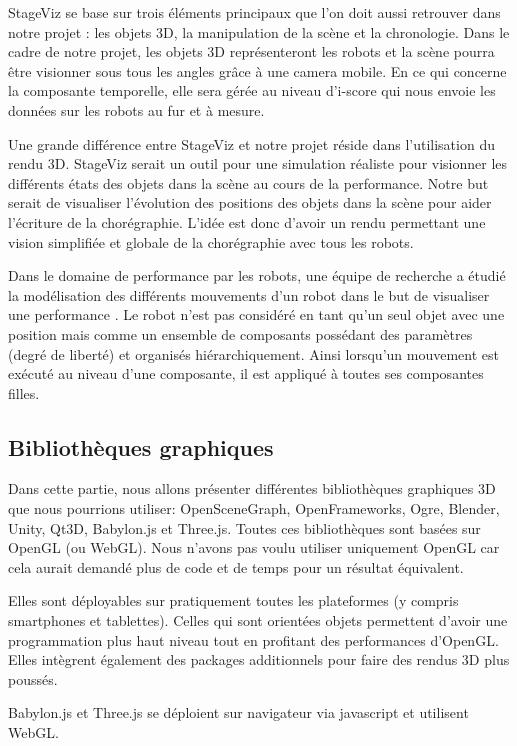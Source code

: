 StageViz se base sur trois éléments principaux que l'on doit aussi retrouver dans notre projet : les objets 3D, la manipulation de la scène et la chronologie. Dans le cadre de notre projet, les objets 3D représenteront les robots et la scène pourra être visionner sous tous les angles grâce à une camera mobile. En ce qui concerne la composante temporelle, elle sera gérée au niveau d'i-score qui nous envoie les données sur les robots au fur et à mesure. 

Une grande différence entre StageViz et notre projet réside dans l'utilisation du rendu 3D. StageViz serait un outil pour une simulation réaliste pour visionner les différents états des objets dans la scène au cours de la performance. Notre but serait de visualiser l'évolution des positions des objets dans la scène pour aider l'écriture de la chorégraphie. L'idée est donc d'avoir un rendu permettant une vision simplifiée et globale de la chorégraphie avec tous les robots.

Dans le domaine de performance par les robots, une équipe de recherche a étudié la modélisation des différents mouvements d'un robot dans le but de visualiser une performance \cite{robotArt}. Le robot n'est pas considéré en tant qu'un seul objet avec une position mais comme un ensemble de composants possédant des paramètres (degré de liberté) et organisés hiérarchiquement. Ainsi lorsqu'un mouvement est exécuté au niveau d'une composante, il est appliqué à toutes ses composantes filles.



\subsection{Bibliothèques graphiques}
Dans cette partie, nous allons présenter différentes bibliothèques graphiques 3D que nous pourrions utiliser: OpenSceneGraph, OpenFrameworks, Ogre, Blender, Unity, Qt3D, Babylon.js et Three.js. Toutes ces bibliothèques sont basées sur OpenGL (ou WebGL). Nous n'avons pas voulu utiliser uniquement OpenGL car cela aurait demandé plus de code et de temps pour un résultat équivalent. 

Elles sont déployables sur pratiquement toutes les plateformes (y compris smartphones et tablettes). Celles qui sont orientées objets permettent d'avoir une programmation plus haut niveau tout en profitant des performances d'OpenGL. Elles intègrent également des packages additionnels pour faire des rendus 3D plus poussés. 

Babylon.js et Three.js se déploient sur navigateur via javascript et utilisent WebGL.


